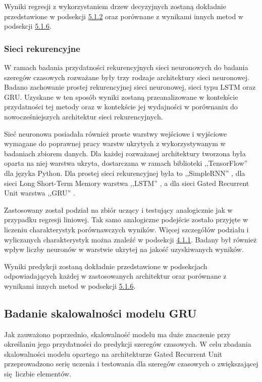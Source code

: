 \documentclass[10pt,a4paper]{article}
\begin{document}
Wyniki regresji z wykorzystaniem drzew decyzyjnych zostaną dokładnie przedstawione w podsekcji \hyperlink{5.1.2}{5.1.2} oraz porównane z wynikami innych metod w podsekcji \hyperlink{5.1.6}{5.1.6}.

\subsubsection{Sieci rekurencyjne}
W ramach badania przydatności rekurencyjnych sieci neuronowych do badania szeregów czasowych rozważane były trzy rodzaje architektury sieci neuronowej. Badano zachowanie prostej rekurencyjnej sieci neuronowej, sieci typu LSTM oraz GRU. Uzyskane w ten sposób wyniki zostaną przeanalizowane w kontekście przydatności tej metody oraz w kontekście jej wydajności w porównaniu do nowocześniejszych architektur sieci rekurencyjnych. 

Sieć neuronowa posiadała również proste warstwy wejściowe i wyjściowe wymagane do poprawnej pracy warstw ukrytych z wykorzystywanym w badaniach zbiorem danych.
Dla każdej rozważanej architektury tworzona była oparta na niej warstwa ukryta, dostarczana w ramach biblioteki ,,TensorFlow'' dla języka Python. Dla prostej sieci rekurencyjnej była to ,,SimpleRNN'' \cite{tfSimpleRNN}, dla sieci Long Short-Term Memory  warstwa ,,LSTM'' \cite{tfLSTM}, a dla sieci Gated Recurrent Unit warstwa ,,GRU'' \cite{tfGRU}.

Zastosowany został podział na zbiór uczący i testujący analogicznie jak w przypadku regresji liniowej. Tak samo analogiczne podejście zostało przyjęte w liczeniu charakterystyk porównawczych wyników. Więcej szczegółów podziału i wyliczanych charakterystyk można znaleźć w podsekcji \hyperlink{subsubsection.4.1.1}{4.1.1}.
Badany był również wpływ liczby neuronów w warstwie ukrytej na jakość uzyskiwanych wyników. 

Wyniki predykcji zostaną dokładnie przedstawione w podsekcjach odpowiadających każdej w zastosowanych architektur oraz porównane z wynikami innych metod w podsekcji \hyperlink{5.1.6}{5.1.6}.


\subsection{Badanie skalowalności modelu GRU}
Jak zauważono poprzednio, skalowalność modelu ma duże znaczenie przy określaniu jego przydatności do predykcji szeregów czasowych. W celu zbadania skalowalności modelu opartego na architekturze Gated Recurrent Unit przeprowadzono serię uczenia i testowania dla szeregów czasowych o zwiększającej się liczbie elementów. 
\end{document}
